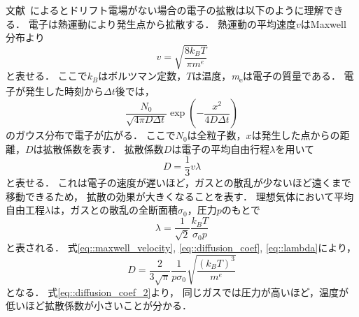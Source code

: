 \documentclass[../master]{subfiles}
\begin{document}
文献~\cite{leo}によるとドリフト電場がない場合の電子の拡散は以下のように理解できる．
電子は熱運動により発生点から拡散する．
熱運動の平均速度$v$はMaxwell 分布より
\begin{equation}
  v = \sqrt{\frac{8k_{B}T}{\pi \si{\electronmass}}}
  \label{eq::maxwell_velocity}
\end{equation}
と表せる．
ここで$k_{B}$はボルツマン定数，$T$は温度，\si{\electronmass}は電子の質量である．
電子が発生した時刻から$\Delta t$後では，
\begin{equation}
  \frac{N_0}{\sqrt{4\pi D \Delta t}}\exp\left(-\frac{x^{2}}{4 D \Delta t}\right)
  \label{eq::gaus_dist}
\end{equation}
のガウス分布で電子が広がる．
ここで$N_{0}$は全粒子数，$x$は発生した点からの距離，$D$は拡散係数を表す．
拡散係数$D$は電子の平均自由行程$\lambda$を用いて
\begin{equation}
  D = \frac{1}{3}v\lambda
  \label{eq::diffusion_coef}
\end{equation}
と表せる．
これは電子の速度が遅いほど，ガスとの散乱が少ないほど遠くまで移動できるため，
拡散の効果が大きくなることを表す．
理想気体において平均自由工程$\lambda$は，ガスとの散乱の全断面積$\sigma_{0}$，圧力$p$のもとで
\begin{equation}
  \lambda = \frac{1}{\sqrt{2}}\frac{k_{B}T}{\sigma_{0}p}
  \label{eq::lambda}
\end{equation}
と表される．
式\ref{eq::maxwell_velocity}, \ref{eq::diffusion_coef}, \ref{eq::lambda}により，
\begin{equation}
  D = \frac{2}{3\sqrt{\pi}}\frac{1}{p\sigma_{0}}\sqrt{\frac{\left(k_{B}T\right)^{3}}{\si{\electronmass}}}
  \label{eq::diffusion_coef_2}
\end{equation}
となる．
式\ref{eq::diffusion_coef_2}より，
同じガスでは圧力が高いほど，温度が低いほど拡散係数が小さいことが分かる．
\end{document}
